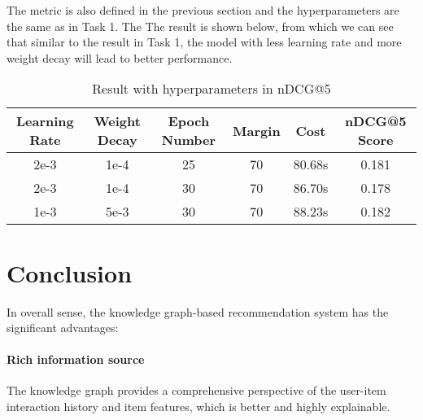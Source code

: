 \documentclass{article}
\begin{document}
The metric is also defined in the previous section and the hyperparameters are the same as in Task 1. The The result is shown below, from which
we can see that similar to the result in Task 1, the model with less learning rate and more weight decay will lead to better performance.

\begin{table}[!htbp]
\setlength{\abovecaptionskip}{+0.2cm}
\setlength{\belowcaptionskip}{+0.2cm}
\centering
\caption{Result with hyperparameters in nDCG@5}
\begin{tabular}{cccccc}
\toprule
\textbf{Learning Rate} & \textbf{Weight Decay} & \textbf{Epoch Number} & \textbf{Margin} & \textbf{Cost} & \textbf{nDCG@5 Score} \\ 
\midrule
2e-3 & 1e-4 & 25 & 70 & 80.68s & 0.181 \\
2e-3 & 1e-4 & 30 & 70 & 86.70s & 0.178 \\
1e-3 & 5e-3 & 30 & 70 & 88.23s & 0.182 \\
\bottomrule
\end{tabular}
\end{table}

\section{Conclusion}

In overall sense, the knowledge graph-based recommendation system has the significant advantages:

\paragraph{Rich information source} The knowledge graph provides a comprehensive perspective of the user-item interaction history and item features, which is better and highly explainable.
\end{document}

